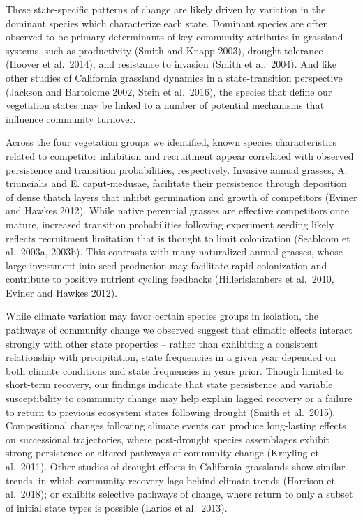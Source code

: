 \documentclass[twoside,12pt,final]{ucthesis-CA2012}
\begin{document}
\begin{ucmainmatter}
These state-specific patterns of change are likely driven by variation in the dominant species which characterize each state.
Dominant species are often observed to be primary determinants of key community attributes in grassland systems, such as productivity (Smith and Knapp 2003), drought tolerance (Hoover et al.~2014), and resistance to invasion (Smith et al.~2004).
And like other studies of California grassland dynamics in a state-transition perspective (Jackson and Bartolome 2002, Stein et al.~2016), the species that define our vegetation states may be linked to a number of potential mechanisms that influence community turnover.

Across the four vegetation groups we identified, known species characteristics related to competitor inhibition and recruitment appear correlated with observed persistence and transition probabilities, respectively.
Invasive annual grasses, A. triuncialis and E. caput-medusae, facilitate their persistence through deposition of dense thatch layers that inhibit germination and growth of competitors (Eviner and Hawkes 2012).
While native perennial grasses are effective competitors once mature, increased transition probabilities following experiment seeding likely reflects recruitment limitation that is thought to limit colonization (Seabloom et al.~2003a, 2003b).
This contrasts with many naturalized annual grasses, whose large investment into seed production may facilitate rapid colonization and contribute to positive nutrient cycling feedbacks (Hillerislambers et al.~2010, Eviner and Hawkes 2012).

While climate variation may favor certain species groups in isolation, the pathways of community change we observed suggest that climatic effects interact strongly with other state properties -- rather than exhibiting a consistent relationship with precipitation, state frequencies in a given year depended on both climate conditions and state frequencies in years prior.
Though limited to short-term recovery, our findings indicate that state persistence and variable susceptibility to community change may help explain lagged recovery or a failure to return to previous ecosystem states following drought (Smith et al.~2015).
Compositional changes following climate events can produce long-lasting effects on successional trajectories, where post-drought species assemblages exhibit strong persistence or altered pathways of community change (Kreyling et al.~2011).
Other studies of drought effects in California grasslands show similar trends, in which community recovery lags behind climate trends (Harrison et al.~2018); or exhibits selective pathways of change, where return to only a subset of initial state types is possible (Larios et al.~2013).


\end{ucmainmatter}
\end{document}
